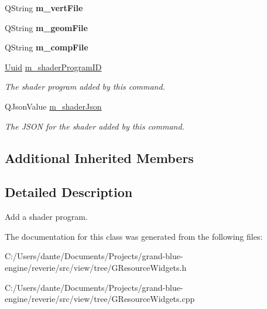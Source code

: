 \begin{Indent}
\begin{DoxyCompactItemize}
Q\+String {\bfseries m\+\_\+vert\+File}
\item 
\mbox{\label{classrev_1_1_add_shader_command_a7c094f1ded830d24cb629c1ec6dba031}} 
Q\+String {\bfseries m\+\_\+geom\+File}
\item 
\mbox{\label{classrev_1_1_add_shader_command_ab9299e298e4c1b5efb8d11276622ae8e}} 
Q\+String {\bfseries m\+\_\+comp\+File}
\item 
\mbox{\label{classrev_1_1_add_shader_command_ac065e80b3a13427da03e241e1e02adb5}} 
\mbox{\hyperlink{classrev_1_1_uuid}{Uuid}} \mbox{\hyperlink{classrev_1_1_add_shader_command_ac065e80b3a13427da03e241e1e02adb5}{m\+\_\+shader\+Program\+ID}}
\begin{DoxyCompactList}\small\item\em The shader program added by this command. \end{DoxyCompactList}\item 
\mbox{\label{classrev_1_1_add_shader_command_ab40df54b085d2d7ae4851cd399525be1}} 
Q\+Json\+Value \mbox{\hyperlink{classrev_1_1_add_shader_command_ab40df54b085d2d7ae4851cd399525be1}{m\+\_\+shader\+Json}}
\begin{DoxyCompactList}\small\item\em The J\+S\+ON for the shader added by this command. \end{DoxyCompactList}\end{DoxyCompactItemize}
\end{Indent}
\subsection*{Additional Inherited Members}


\subsection{Detailed Description}
Add a shader program. 

The documentation for this class was generated from the following files\+:\begin{DoxyCompactItemize}
\item 
C\+:/\+Users/dante/\+Documents/\+Projects/grand-\/blue-\/engine/reverie/src/view/tree/G\+Resource\+Widgets.\+h\item 
C\+:/\+Users/dante/\+Documents/\+Projects/grand-\/blue-\/engine/reverie/src/view/tree/G\+Resource\+Widgets.\+cpp\end{DoxyCompactItemize}
